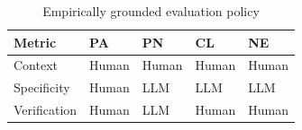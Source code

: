 \begin{table}
\caption{Empirically grounded evaluation policy}
\label{tab:rq1-policy}
\begin{tabular}{lllll}
\toprule
Metric & PA & PN & CL & NE \\
\midrule
Context & Human & Human & Human & Human \\
Specificity & Human & LLM & LLM & LLM \\
Verification & Human & LLM & Human & Human \\
\bottomrule
\end{tabular}
\end{table}

